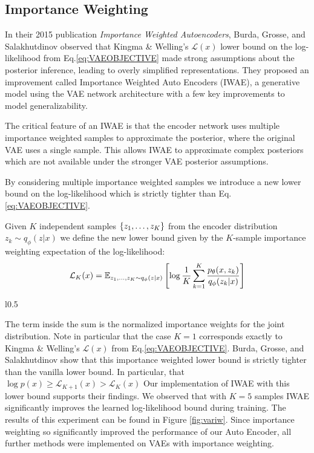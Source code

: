 \documentclass{article} %
\numberwithin{figure}{section}
\renewcommand{\L}{\mathcal{L}}
\begin{document}
\subsection{Importance Weighting}
In their 2015 publication \textit{Importance Weighted Autoencoders}, Burda, Grosse, and Salakhutdinov observed that Kingma \& Welling's $\L(x)$ lower bound on the log-likelihood from Eq.\ref{eq:VAEOBJECTIVE} made strong assumptions about the posterior inference, leading to overly simplified representations. They proposed an improvement called Importance Weighted Auto Encoders (IWAE), a generative model using the VAE network architecture with a few key improvements to model generalizability.
\par The critical feature of an IWAE is that the encoder network uses multiple importance weighted samples to approximate the posterior, where the original VAE uses a single sample. This allows IWAE to approximate complex posteriors which are not available under the stronger VAE posterior assumptions.
\par By considering multiple importance weighted samples we introduce a new lower bound on the log-likelihood which is strictly tighter than Eq.\ref{eq:VAEOBJECTIVE}.
\par Given $K$ independent samples $\{z_1,\mathellipsis,z_K\}$ from the encoder distribution $z_k\sim q_\phi(z|x)$ we define the new lower bound given by the $K$-sample importance weighting expectation of the log-likelihood:
\begin{equation}
   \L_K(x) = \mathbb{E}_{z_1,\mathellipsis,z_K \sim q_\phi(z|x)}\left[\log\frac{1}{K}\sum_{k=1}^{K}\frac{p_\theta(x,z_k)}{q_\phi(z_k|x)}\right]
\end{equation}
\begin{wrapfigure}{l}{0.5\textwidth}
  \captionsetup[subfigure]{justification=centering}
  \resizebox{\linewidth}{!}{}
  \caption{Variational v.s. Importance Weighted (IW)}
  \label{fig:variw}
\end{wrapfigure}
The term inside the sum is the normalized importance weights for the joint distribution. Note in particular that the case $K=1$ corresponds exactly to Kingma \& Welling's $\L(x)$ from Eq.\ref{eq:VAEOBJECTIVE}. Burda, Grosse, and Salakhutdinov show that this importance weighted lower bound is strictly tighter than the vanilla lower bound. In particular, that $\log p(x) \geq \L_{K+1}(x)>\L_K(x)$ Our implementation of IWAE with this lower bound supports their findings. We observed that with $K=5$ samples IWAE significantly improves the learned log-likelihood bound during training. The results of this experiment can be found in Figure \ref{fig:variw}. Since importance weighting so significantly improved the performance of our Auto Encoder, all further methods were implemented on VAEs with importance weighting.
\end{document}

